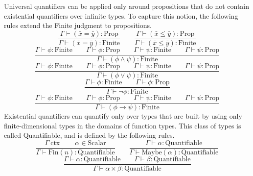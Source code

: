 \documentclass[11pt]{article}
\begin{document}
Universal quantifiers can be applied only around propositions
that do not contain existential quantifiers over infinite
types. To capture this notion, the following rules extend
the Finite judgment to propositions.
\begin{equation}
	\frac{\Gamma \vdash (\bar{x} = \bar{y}) : \text{Prop}}
	{\Gamma \vdash (\bar{x} = \bar{y}) : \text{Finite}}
	\qquad
	\frac{\Gamma \vdash (\bar{x} \leq \bar{y}) : \text{Prop}}
	{\Gamma \vdash (\bar{x} \leq \bar{y}) : \text{Finite}}
\end{equation}
\begin{equation}
	\frac{\Gamma \vdash \phi : \text{Finite}
	\qquad \Gamma \vdash \phi : \text{Prop}
	\qquad \Gamma \vdash \psi : \text{Finite}
	\qquad \Gamma \vdash \psi : \text{Prop}}
	{\Gamma \vdash (\phi \wedge \psi) : \text{Finite}}
\end{equation}
\begin{equation}
	\frac{\Gamma \vdash \phi : \text{Finite}
	\qquad \Gamma \vdash \phi : \text{Prop}
	\qquad \Gamma \vdash \psi : \text{Finite}
	\qquad \Gamma \vdash \psi : \text{Prop}}
	{\Gamma \vdash (\phi \vee \psi) : \text{Finite}}
\end{equation}
\begin{equation}
	\frac{\Gamma \vdash \phi : \text{Finite}
	\qquad \Gamma \vdash \phi : \text{Prop}}
	{\Gamma \vdash \neg\phi : \text{Finite}}
\end{equation}
\begin{equation}
	\frac{\Gamma \vdash \phi : \text{Finite}
	\qquad \Gamma \vdash \phi : \text{Prop}
	\qquad \Gamma \vdash \psi : \text{Finite}
	\qquad \Gamma \vdash \psi : \text{Prop}}
	{\Gamma \vdash (\phi \to \psi) : \text{Finite}}
\end{equation}
Existential quantifiers can quantify only over types that
are built by using only finite-dimensional types in the domains
of function types. This class of types is called Quantifiable,
and is defined by the following rules.
\begin{equation}
	\label{eq:quantifiable-first}
	\frac{\Gamma\ \text{ctx}\
	 \qquad \alpha \in \text{Scalar}}
	{\Gamma \vdash \text{Fin}(n) : \text{Quantifiable}}
	\qquad
	\frac{\Gamma \vdash \alpha : \text{Quantifiable}}
	{\Gamma \vdash \text{Maybe}(\alpha) : \text{Quantifiable}}
\end{equation}
\begin{equation}
	\frac{\Gamma \vdash \alpha : \text{Quantifiable}
	\qquad \Gamma \vdash \beta : \text{Quantifiable}}
	{\Gamma \vdash \alpha \times \beta : \text{Quantifiable}}
\end{equation}
\end{document}
